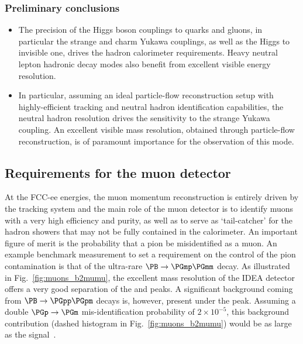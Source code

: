 \subsubsection{Preliminary conclusions}

\begin{itemize}

\item The precision of the Higgs boson couplings to quarks and gluons, in particular the strange and charm Yukawa couplings, 
as well as the Higgs to invisible one, drives the hadron calorimeter requirements. 
Heavy neutral lepton hadronic decay modes also benefit from excellent visible energy resolution.

\item In particular, assuming an ideal particle-flow reconstruction setup with highly-efficient tracking and neutral hadron identification capabilities, 
the neutral hadron resolution drives the sensitivity to the strange Yukawa coupling. 
An excellent visible mass resolution, obtained through particle-flow reconstruction, is of paramount importance for the observation of this mode.  
\end{itemize}

\subsection{Requirements for the muon detector}
\label{sec:PhysPerf_muons}

At the FCC-ee energies, the muon momentum reconstruction is entirely driven by the tracking system 
and the main role of the muon detector is to identify muons with a very high efficiency and purity, 
as well as to serve as `tail-catcher' for the hadron showers that may not be fully contained in the calorimeter. 
An important figure of merit is the probability that a pion be misidentified as a muon.
An example benchmark measurement to set a requirement on the control of the pion contamination is that of the ultra-rare $\PB \to \PGmp\PGmm$ decay. 
As illustrated in Fig.~\ref{fig:muons_b2mumu}, the excellent mass resolution of the IDEA detector offers a very good separation of the \PB and \PBs peaks. 
A significant background coming from $\PB \to \PGpp \PGpm$ decays is, however, present under the \PB peak. 
Assuming a double $\PGp \to \PGm$ mis-identification probability of $2 \times 10^{-5}$, 
this background contribution (dashed histogram in Fig.~\ref{fig:muons_b2mumu}) would be as large as the signal~\cite{Monteil:2021ith}. 

